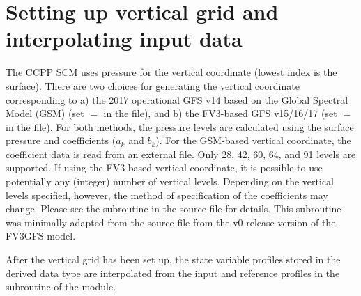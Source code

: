 \section{Setting up vertical grid and interpolating input data}
The CCPP SCM uses pressure for the vertical coordinate (lowest index is the surface). There are two choices for generating the vertical coordinate corresponding to a) the 2017 operational GFS v14 based on the Global Spectral Model (GSM) (set  $=$  in the  file), and b) the FV3-based GFS v15/16/17 (set  $=$  in the  file). For both methods, the pressure levels are calculated using the surface pressure and coefficients ($a_k$ and $b_k$). For the GSM-based vertical coordinate, the coefficient data is read from an external file. Only 28, 42, 60, 64, and 91 levels are supported. If using the FV3-based vertical coordinate, it is possible to use potentially any (integer) number of vertical levels. Depending on the vertical levels specified, however, the method of specification of the coefficients may change. Please see the subroutine  in the source file  for details. This subroutine was minimally adapted from the source file  from the v0 release version of the FV3GFS model.

After the vertical grid has been set up, the state variable profiles stored in the  derived data type are interpolated from the input and reference profiles in the  subroutine of the  module.

